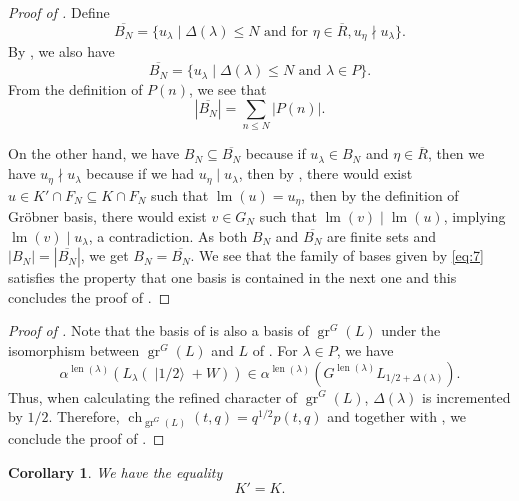 \documentclass[a4paper, 12pt, reqno]{amsart}
\newtheorem{corollary}[theorem]{Corollary}
\theoremstyle{remark}
\DeclareMathOperator{\gr}{gr}
\DeclareMathOperator{\ch}{ch}
\DeclareMathOperator{\lm}{lm}
\DeclareMathOperator{\len}{len}
\DeclareMathOperator{\vachalf}{|1/2\rangle}
\begin{document}
\begin{proof}[Proof of ]
  Define
  \begin{equation*}
    \overline{B_N} = \{u_{\lambda} \mid \Delta(\lambda) \le N\text{ and for }\eta \in \overline{R}, u_{\eta} \nmid u_{\lambda}\}.
  \end{equation*}
  By , we also have
  \begin{equation*}
    \overline{B_N} = \{u_{\lambda} \mid \Delta(\lambda) \le N\text{ and }\lambda \in P\}.
  \end{equation*}
  From the definition of $P(n)$, we see that
  \begin{equation*}
    |\overline{B_N}| = \sum_{n \le N}|P(n)|.
  \end{equation*}

  On the other hand, we have $B_N \subseteq \overline{B_N}$ because if $u_{\lambda} \in B_N$ and $\eta \in \overline{R}$, then we have $u_{\eta} \nmid u_{\lambda}$ because if we had $u_{\eta} \mid u_{\lambda}$, then by , there would exist $u \in K' \cap F_N \subseteq K \cap F_N$ such that $\lm(u) = u_{\eta}$, then by the definition of Gr\"{o}bner basis, there would exist $v \in G_N$ such that $\lm(v) \mid \lm(u)$, implying $\lm(v) \mid u_{\lambda}$, a contradiction.
  As both $B_N$ and $\overline{B_N}$ are finite sets and $|B_N| = |\overline{B_N}|$, we get $B_N = \overline{B_N}$.
  We see that the family of bases given by \eqref{eq:7} satisfies the property that one basis is contained in the next one and this concludes the proof of .
\end{proof}

\begin{proof}[Proof of ]
  Note that the basis of  is also a basis of $\gr^G(L)$ under the isomorphism between $\gr^G(L)$ and $L$ of .
  For $\lambda \in P$, we have
  \begin{equation*}
    \alpha^{\len(\lambda)}(L_{\lambda}(\vachalf + W)) \in \alpha^{\len(\lambda)}(G^{\len(\lambda)}L_{1/2 + \Delta(\lambda)}).
  \end{equation*}
  Thus, when calculating the refined character of $\gr^G(L)$, $\Delta(\lambda)$ is incremented by $1/2$.
  Therefore, $\ch_{\gr^G(L)}(t, q) = q^{1/2}p(t, q)$ and together with , we conclude the proof of .
\end{proof}

\begin{corollary}
  \label{crl:1}
  We have the equality
  \begin{equation*}
    K' = K.
  \end{equation*}
\end{corollary}
\end{document}
